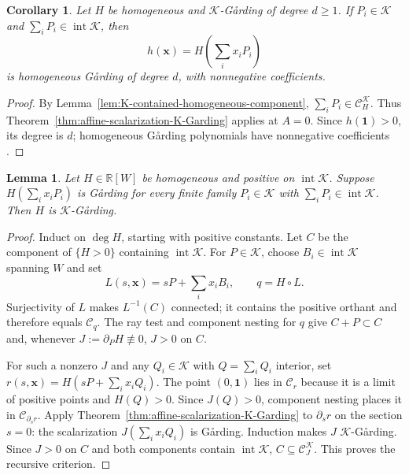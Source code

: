 \documentclass[oneside,english,letterpaper]{amsart}
\numberwithin{equation}{section}
\theoremstyle{plain}
\newtheorem{lem}[thm]{Lemma}
\newtheorem{cor}[thm]{Corollary}
\theoremstyle{definition}
\theoremstyle{remark}
\def\x{\mathbf{x}}
\def\one{\mathbf{1}}
\begin{document}
\begin{cor}
\label{cor:homogeneous-K-scalarization}
Let $H$ be homogeneous and $\mathcal K$-G{\aa}rding of degree
$d\geq1$. If $P_i\in\mathcal K$ and
$\sum_iP_i\in\operatorname{int}\mathcal K$, then
\[
h(\x)=H\left(\sum_i x_iP_i\right)
\]
is homogeneous G{\aa}rding of degree $d$, with nonnegative coefficients.
\end{cor}
\begin{proof}
By Lemma~\ref{lem:K-contained-homogeneous-component},
$\sum_iP_i\in\mathcal C_H^{\mathcal K}$. Thus
Theorem~\ref{thm:affine-scalarization-K-Garding} applies at $A=0$.
Since $h(\one)>0$, its degree is $d$; homogeneous G{\aa}rding
polynomials have nonnegative coefficients \cite{Fang-MaGard}.
\end{proof}

\begin{lem}
\label{lem:homogeneous-conic-reconstruction}
Let $H\in\mathbb R[W]$ be homogeneous and positive on
$\operatorname{int}\mathcal K$. Suppose
$H(\sum_i x_iP_i)$ is G{\aa}rding for every finite family
$P_i\in\mathcal K$ with $\sum_iP_i\in\operatorname{int}\mathcal K$.
Then $H$ is $\mathcal K$-G{\aa}rding.
\end{lem}
\begin{proof}
Induct on $\deg H$, starting with positive constants. Let $C$ be
the component of $\{H>0\}$ containing $\operatorname{int}\mathcal K$.
For $P\in\mathcal K$, choose $B_i\in\operatorname{int}\mathcal K$
spanning $W$ and set
\[
L(s,\x)=sP+\sum_i x_iB_i,\qquad q=H\circ L.
\]
Surjectivity of $L$ makes $L^{-1}(C)$ connected; it contains the
positive orthant and therefore equals $\mathcal C_q$.
The ray test and component nesting for $q$ give
$C+P\subset C$ and, whenever $J:=\partial_PH\not\equiv0$,
$J>0$ on $C$.

For such a nonzero $J$ and any $Q_i\in\mathcal K$ with
$Q=\sum_iQ_i$ interior, set
$r(s,\x)=H(sP+\sum_i x_iQ_i)$.
The point $(0,\one)$ lies in $\mathcal C_r$ because it is a limit
of positive points and $H(Q)>0$. Since $J(Q)>0$, component nesting
places it in $\mathcal C_{\partial_s r}$.
Apply Theorem~\ref{thm:affine-scalarization-K-Garding} to
$\partial_s r$ on the section $s=0$: the scalarization
$J(\sum_i x_iQ_i)$ is G{\aa}rding.
Induction makes $J$ $\mathcal K$-G{\aa}rding. Since $J>0$ on $C$
and both components contain $\operatorname{int}\mathcal K$,
$C\subseteq\mathcal C_J^{\mathcal K}$.
This proves the recursive criterion.
\end{proof}
\end{document}

